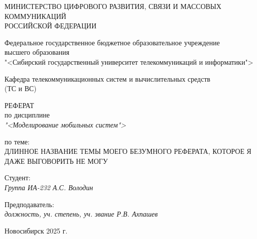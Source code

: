 \thispagestyle{empty}

\begin{center}
    МИНИСТЕРСТВО ЦИФРОВОГО РАЗВИТИЯ, СВЯЗИ И МАССОВЫХ КОММУНИКАЦИЙ \\ РОССИЙСКОЙ ФЕДЕРАЦИИ

    \vspace{20pt}

    Федеральное государственное бюджетное образовательное учреждение  \\  высшего образования \\
    "<Сибирский государственный университет телекоммуникаций и информатики"> \\

    \vspace{20pt}

    Кафедра телекоммуникационных систем и вычислительных средств \\  (ТС и ВС)
\end{center}

\vfill

\begin{center}
    РЕФЕРАТ \\  
    по дисциплине \\
    \textit{"<Моделирование мобильных систем">}

    \vspace{20pt}

    по теме: \\
    \uppercase{Длинное название темы моего безумного реферата, которое я даже выговорить не могу}
\end{center}

\vfill

    \noindent Студент: \\
    \textit{Группа ИА-232 \hfill А.С. Володин}

    \vspace{20pt}

    \noindent Предподаватель: \\
    \textit{должность, уч. степень, уч. звание \hfill Р.В. Ахпашев}

\vfill

\begin{center}
    Новосибирск 2025 г.
\end{center}